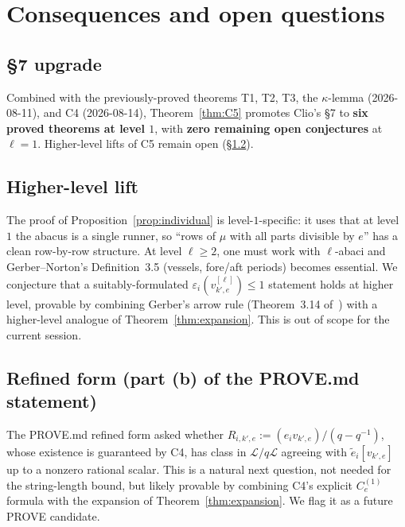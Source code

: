 \documentclass[11pt]{article}
\theoremstyle{definition}
\newcommand{\vke}{v_{k',e}}
\newcommand{\Lcr}{\mathcal{L}}
\newcommand{\ee}{\tilde e}
\newcommand{\eps}{\varepsilon}
\newcommand{\Ce}{C_e^{(1)}}
\begin{document}
\section{Consequences and open questions}

\subsection{§7 upgrade}

Combined with the previously-proved theorems T1, T2, T3, the $\kappa$-lemma
(2026-08-11), and C4 (2026-08-14), Theorem~\ref{thm:C5} promotes
Clio's §7 to \textbf{six proved theorems at level $1$}, with
\textbf{zero remaining open conjectures} at $\ell = 1$. Higher-level lifts
of C5 remain open (§\ref{sec:higher-level}).

\subsection{Higher-level lift}\label{sec:higher-level}

The proof of Proposition~\ref{prop:individual} is level-$1$-specific: it
uses that at level $1$ the abacus is a single runner, so ``rows of $\mu$
with all parts divisible by $e$'' has a clean row-by-row structure. At
level $\ell \ge 2$, one must work with $\ell$-abaci and
Gerber--Norton's Definition~3.5 (vessels, fore/aft periods) becomes
essential. We conjecture that a suitably-formulated
$\eps_i(\vke^{[\ell]}) \le 1$ statement holds at higher level, provable by
combining Gerber's arrow rule (Theorem~3.14 of~\cite{GN2017}) with a
higher-level analogue of Theorem~\ref{thm:expansion}. This is out of
scope for the current session.

\subsection{Refined form (part (b) of the PROVE.md statement)}

The PROVE.md refined form asked whether $R_{i, k', e} := (e_i \vke)/(q - q^{-1})$,
whose existence is guaranteed by C4, has class in $\Lcr/q\Lcr$ agreeing
with $\ee_i[\vke]$ up to a nonzero rational scalar. This is a natural
next question, not needed for the string-length bound, but likely provable
by combining C4's explicit $\Ce$ formula with the expansion of
Theorem~\ref{thm:expansion}. We flag it as a future PROVE candidate.
\end{document}
